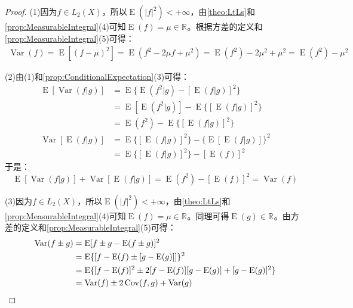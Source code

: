 \begin{proof}
	(1)因为$f\in L_2(X)$，所以$\operatorname{E}(|f|^2)<+\infty$，由\cref{theo:LtLs}和\cref{prop:MeasurableIntegral}(4)可知$\operatorname{E}(f)=\mu\in\mathbb{R}^{}$。根据方差的定义和\cref{prop:MeasurableIntegral}(5)可得：
	\begin{align*}
		\operatorname{Var}(f)
		=\operatorname{E}[(f-\mu)^2]
		=\operatorname{E}(f^2-2\mu f+\mu^2)
		=\operatorname{E}(f^2)-2\mu^2+\mu^2
		=\operatorname{E}(f^2)-\mu^2
	\end{align*}\par
	(2)由(1)和\cref{prop:ConditionalExpectation}(3)可得：
	\begin{align*}
		\operatorname{E}[\operatorname{Var}(f|g)]
		&=\operatorname{E}\{\operatorname{E}(f^2|g)-[\operatorname{E}(f|g)]^2\} \\
		&=\operatorname{E}[\operatorname{E}(f^2|g)]-\operatorname{E}\{[\operatorname{E}(f|g)]^2\} \\
		&=\operatorname{E}(f^2)-\operatorname{E}\{[\operatorname{E}(f|g)]^2\} \\
		\operatorname{Var}[\operatorname{E}(f|g)]
		&=\operatorname{E}\{[\operatorname{E}(f|g)]^2\}-\{\operatorname{E}[\operatorname{E}(f|g)]\}^2 \\
		&=\operatorname{E}\{[\operatorname{E}(f|g)]^2\}-[\operatorname{E}(f)]^2
	\end{align*}
	于是：
	\begin{equation*}
		\operatorname{E}[\operatorname{Var}(f|g)]+\operatorname{Var}[\operatorname{E}(f|g)]=\operatorname{E}(f^2)-[\operatorname{E}(f)]^2=\operatorname{Var}(f)
	\end{equation*}\par
	(3)因为$f\in L_2(X)$，所以$\operatorname{E}(|f|^2)<+\infty$，由\cref{theo:LtLs}和\cref{prop:MeasurableIntegral}(4)可知$\operatorname{E}(f)=\mu\in\mathbb{R}^{}$。同理可得$\operatorname{E}(g)\in\mathbb{R}^{}$。由方差的定义和\cref{prop:MeasurableIntegral}(5)可得：
	\begin{align*}
		\operatorname{Var}(f\pm g)
		&=\operatorname{E}[f\pm g-\operatorname{E}(f\pm g)]^2 \\
		&=\operatorname{E}\{[f-\operatorname{E}(f)\pm[g-\operatorname{E}(g)]]\}^2 \\
		&=\operatorname{E}\{[f-\operatorname{E}(f)]^2\pm 2[f-\operatorname{E}(f)][g-\operatorname{E}(g)]+[g-\operatorname{E}(g)]^2\} \\
		&=\operatorname{Var}(f)\pm2\operatorname{Cov}(f,g)+\operatorname{Var}(g)\qedhere
	\end{align*}
\end{proof}

